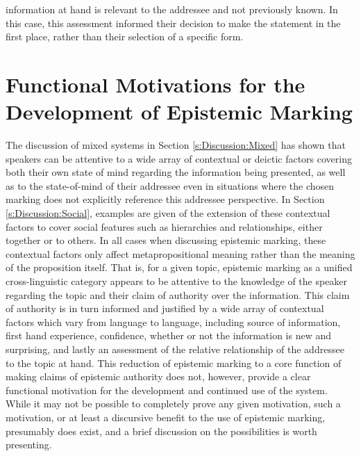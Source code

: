 information at hand is relevant to the addressee and not previously known. In this case, this assessment informed their decision to make the statement in the first place, rather than their selection of a specific form.

\section{Functional Motivations for the Development of Epistemic Marking}\label{s:Discussion:Motivations}
The discussion of mixed systems in Section \ref{s:Discussion:Mixed} has shown that speakers can be attentive to a wide array of contextual or deictic factors covering both their own state of mind regarding the information being presented, as well as to the state-of-mind of their addressee even in situations where the chosen marking does not explicitly reference this addressee perspective. In Section \ref{s:Discussion:Social}, examples are given of the extension of these contextual factors to cover social features such as hierarchies and relationships, either together or to others. In all cases when discussing epistemic marking, these contextual factors only affect metapropositional meaning rather than the meaning of the proposition itself. That is, for a given topic, epistemic marking as a unified cross-linguistic category appears to be attentive to the knowledge of the speaker regarding the topic and their claim of authority over the information. This claim of authority is in turn informed and justified by a wide array of contextual factors which vary from language to language, including source of information, first hand experience, confidence, whether or not the information is new and surprising, and lastly an assessment of the relative relationship of the addressee to the topic at hand. This reduction of epistemic marking to a core function of making claims of epistemic authority does not, however, provide a clear functional motivation for the development and continued use of the system. While it may not be possible to completely prove any given motivation, such a motivation, or at least a discursive benefit to the use of epistemic marking, presumably does exist, and a brief discussion on the possibilities is worth presenting. 

